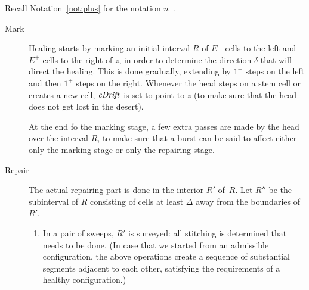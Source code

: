 \documentclass[12pt]{memoir}
\newcommand{\fld}[1]{\ensuremath{\textit{#1\/}}}
\newcommand{\E}{E}
\newcommand{\R}{R}
\newcommand{\z}{z}
\newcommand{\Drift}{\fld{Drift}}
\newcommand{\cDrift}{\fld{cDrift}}
\begin{document}
Recall Notation~\ref{not:plus} for the notation \( n^{+} \).
\begin{description}

\item[Mark]
Healing starts by marking an initial interval \( \R \) of \( \E^{+} \) cells
to the left and \( \E^{+} \) cells to the  right of \( \z \), in order
to determine the direction \( \delta \) that will direct the healing.
This is done gradually, extending by \( 1^{+} \) steps on the left and then
\( 1^{+} \) steps on the right.
Whenever the head steps on a stem cell or creates a new cell, 
\( \cDrift \) is set to point to \( \z \) (to make sure that the head does not get
lost in the desert).

At the end fo the marking stage, a few extra passes are made by the head
over the interval \( \R \), to make sure that a burst can be said to
affect either only the marking stage or only the repairing stage.





\item[Repair] The actual repairing part is done in the interior \( \R' \) of~\( \R \).
Let \( R'' \) be the subinterval of \( R \) consisting of cells at least \( \Delta \) away
from the boundaries of \( R' \).

\begin{enumerate}[label=R\arabic*, ref=R\arabic*]

\item\label{i:survey} In a pair of sweeps, \( \R' \) is surveyed: 
all stitching is determined that needs to be done.
(In case that we started from an admissible configuration, the above operations
create a sequence of substantial segments adjacent to each other, satisfying the 
requirements of a healthy configuration.)


\end{enumerate}
\end{description}
\end{document}
